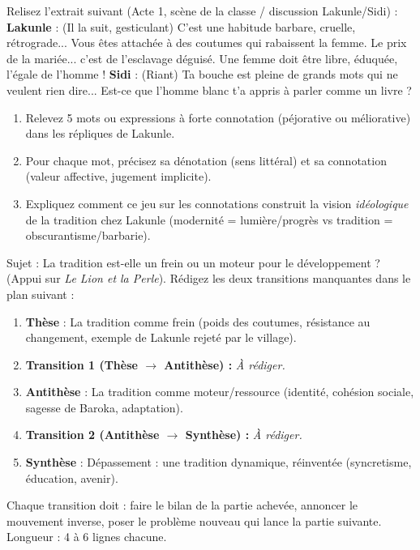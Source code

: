 \documentclass[11pt]{article}
\begin{document}
\begin{exercice}
Relisez l'extrait suivant (Acte 1, scène de la classe / discussion Lakunle/Sidi) :
\og \textbf{Lakunle} : (Il la suit, gesticulant) C'est une habitude barbare, cruelle, rétrograde... Vous êtes attachée à des coutumes qui rabaissent la femme. Le prix de la mariée... c'est de l'esclavage déguisé. Une femme doit être libre, éduquée, l'égale de l'homme ! \fg
\og \textbf{Sidi} : (Riant) Ta bouche est pleine de grands mots qui ne veulent rien dire... Est-ce que l'homme blanc t'a appris à parler comme un livre ? \fg
\begin{enumerate}
\item Relevez 5 mots ou expressions à forte connotation (péjorative ou méliorative) dans les répliques de Lakunle.
\item Pour chaque mot, précisez sa dénotation (sens littéral) et sa connotation (valeur affective, jugement implicite).
\item Expliquez comment ce jeu sur les connotations construit la vision \emph{idéologique} de la tradition chez Lakunle (modernité = lumière/progrès vs tradition = obscurantisme/barbarie).
\end{enumerate}
\end{exercice}

\begin{exercice}
Sujet : \og La tradition est-elle un frein ou un moteur pour le développement ? \fg (Appui sur \emph{Le Lion et la Perle}).
Rédigez les deux transitions manquantes dans le plan suivant :
\begin{enumerate}
\item \textbf{Thèse} : La tradition comme frein (poids des coutumes, résistance au changement, exemple de Lakunle rejeté par le village).
\item \textbf{Transition 1 (Thèse $\rightarrow$ Antithèse) :} \textit{À rédiger.}
\item \textbf{Antithèse} : La tradition comme moteur/ressource (identité, cohésion sociale, sagesse de Baroka, adaptation).
\item \textbf{Transition 2 (Antithèse $\rightarrow$ Synthèse) :} \textit{À rédiger.}
\item \textbf{Synthèse} : Dépassement : une tradition dynamique, réinventée (syncretisme, éducation, avenir).
\end{enumerate}
Chaque transition doit : faire le bilan de la partie achevée, annoncer le mouvement inverse, poser le problème nouveau qui lance la partie suivante. Longueur : 4 à 6 lignes chacune.
\end{exercice}
\end{document}
